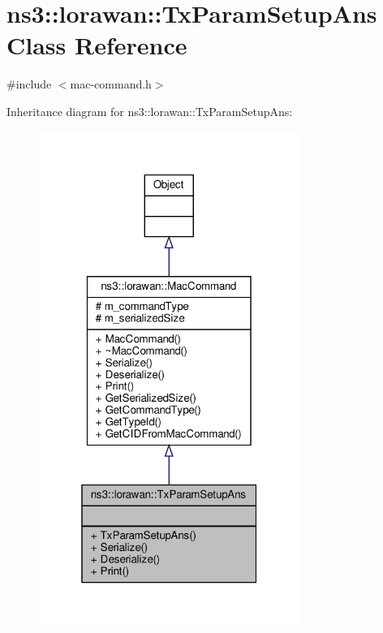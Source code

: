 \hypertarget{classns3_1_1lorawan_1_1TxParamSetupAns}{}\section{ns3\+:\+:lorawan\+:\+:Tx\+Param\+Setup\+Ans Class Reference}
\label{classns3_1_1lorawan_1_1TxParamSetupAns}


{\ttfamily \#include $<$mac-\/command.\+h$>$}



Inheritance diagram for ns3\+:\+:lorawan\+:\+:Tx\+Param\+Setup\+Ans\+:
\nopagebreak
\begin{figure}[H]
\begin{center}
\leavevmode
\includegraphics[width=241pt]{classns3_1_1lorawan_1_1TxParamSetupAns__inherit__graph}
\end{center}
\end{figure}


